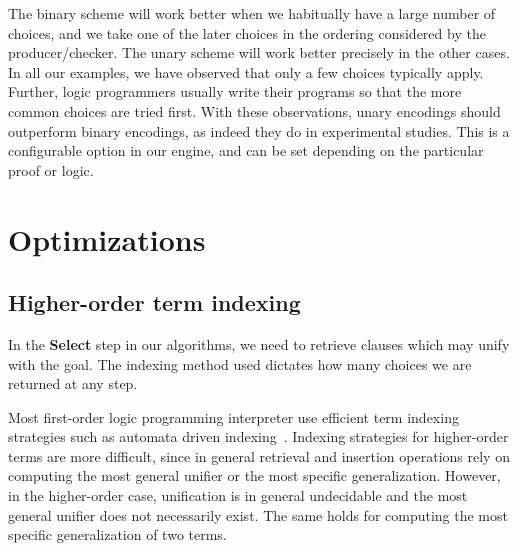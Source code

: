 \documentclass{llncs}
\begin{document}
The binary scheme will work better when we habitually have a large
number of choices, and we take one of the later choices in the
ordering considered by the producer/checker. The unary scheme will
work better precisely in the other cases. In all our examples, we have
observed that only a few choices typically apply. Further, logic
programmers usually write their programs so that the more common
choices are tried first. With these observations, unary encodings
should outperform binary encodings, as indeed they do in experimental
studies. This is a configurable option in our engine, and can be set
depending on the particular proof or logic.

\section{Optimizations}
\subsection{Higher-order term indexing}\label{sec:indexing}
In the {\bf Select} step in our algorithms, we need to retrieve
clauses which may unify with the goal. The indexing method used
dictates how many choices we are returned at any step.

Most first-order logic programming interpreter use efficient term
indexing strategies such as automata driven
indexing~\cite{Ramakrishnan01:indexing}. Indexing strategies for
higher-order terms are more difficult, since in general retrieval and
insertion operations rely on computing the most general unifier or the
most specific generalization. However, in the higher-order case,
unification is in general undecidable and the most general unifier
does not necessarily exist. The same holds for computing the most
specific generalization of two terms.

\end{document}
